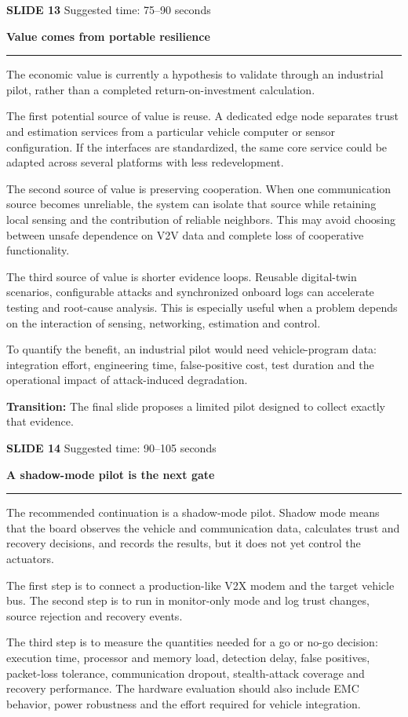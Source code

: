 \documentclass[11pt,a4paper]{article}
\newcommand{\slidetitle}[3]{%
  \clearpage
  {\color{Accent}\large\bfseries SLIDE #1}\hfill
  {\color{Muted}\small Suggested time: #3}\par
  \vspace{0.18cm}
  {\LARGE\bfseries #2}\par
  \vspace{0.20cm}
  {\color{Muted}\rule{\textwidth}{0.5pt}}\par
  \vspace{0.12cm}
}
\newcommand{\transition}[1]{%
  \vfill
  \colorbox{Panel}{%
    \parbox{\dimexpr\textwidth-2\fboxsep\relax}{%
      \raggedright\textbf{Transition:} #1}}
}
\begin{document}
\slidetitle{13}{Value comes from portable resilience}{75--90 seconds}

The economic value is currently a hypothesis to validate through an industrial pilot, rather than a completed return-on-investment calculation.

The first potential source of value is reuse. A dedicated edge node separates trust and estimation services from a particular vehicle computer or sensor configuration. If the interfaces are standardized, the same core service could be adapted across several platforms with less redevelopment.

The second source of value is preserving cooperation. When one communication source becomes unreliable, the system can isolate that source while retaining local sensing and the contribution of reliable neighbors. This may avoid choosing between unsafe dependence on V2V data and complete loss of cooperative functionality.

The third source of value is shorter evidence loops. Reusable digital-twin scenarios, configurable attacks and synchronized onboard logs can accelerate testing and root-cause analysis. This is especially useful when a problem depends on the interaction of sensing, networking, estimation and control.

To quantify the benefit, an industrial pilot would need vehicle-program data: integration effort, engineering time, false-positive cost, test duration and the operational impact of attack-induced degradation.

\transition{The final slide proposes a limited pilot designed to collect exactly that evidence.}

\slidetitle{14}{A shadow-mode pilot is the next gate}{90--105 seconds}

The recommended continuation is a shadow-mode pilot. Shadow mode means that the board observes the vehicle and communication data, calculates trust and recovery decisions, and records the results, but it does not yet control the actuators.

The first step is to connect a production-like V2X modem and the target vehicle bus. The second step is to run in monitor-only mode and log trust changes, source rejection and recovery events.

The third step is to measure the quantities needed for a go or no-go decision: execution time, processor and memory load, detection delay, false positives, packet-loss tolerance, communication dropout, stealth-attack coverage and recovery performance. The hardware evaluation should also include EMC behavior, power robustness and the effort required for vehicle integration.
\end{document}
